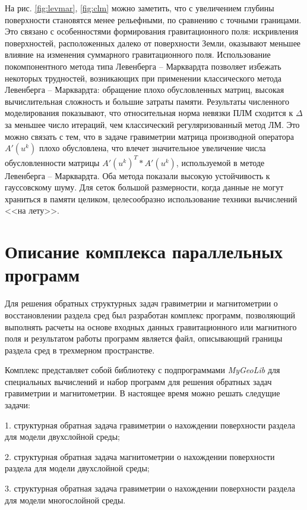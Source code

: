 На рис. \ref{fig:levmar}, \ref{fig:clm} можно заметить, что с увеличением глубины поверхности становятся менее рельефными, по сравнению с точными границами. Это связано с особенностями формирования гравитационного поля: искривления поверхностей, расположенных далеко от поверхности Земли, оказывают меньшее влияние на изменения суммарного гравитационного поля. Использование покомпонентного метода типа Левенберга -- Марквардта позволяет избежать некоторых трудностей, возникающих при применении классического метода Левенберга -- Марквардта: обращение плохо обусловленных матриц, высокая вычислительная сложность и большие затраты памяти. Результаты численного моделирования показывают, что относительная норма невязки ПЛМ сходится к $\Delta$ за меньшее число итераций, чем классический регуляризованный метод ЛМ. Это можно связать с тем, что в задаче гравиметрии матрица производной оператора $A'(u^k)$ плохо обусловлена, что влечет значительное увеличение числа обусловленности матрицы $A'(u^k)^T*A'(u^k)$, используемой в методе Левенберга -- Марквардта. Оба метода показали высокую устойчивость к гауссовскому шуму. Для сеток большой размерности, когда данные не могут храниться в памяти целиком, целесообразно использование техники вычислений <<на лету>>.

\newpage
\section{Описание комплекса параллельных программ}

Для решения обратных структурных задач гравиметрии и магнитометрии о восстановлении раздела сред был разработан комплекс программ, позволяющий выполнять расчеты на основе входных данных гравитационного или магнитного поля и результатом работы программ является файл, описывающий границы раздела сред в трехмерном пространстве.

Комплекс представляет собой библиотеку с подпрограммами \textit{MyGeoLib} для специальных вычислений и набор программ для решения обратных задач гравиметрии и магнитометрии. В настоящее время можно решать следущие задачи:

1. структурная обратная задача гравиметрии о нахождении поверхности раздела для модели двухслойной среды;

2. структурная обратная задача магнитометрии о нахождении поверхности раздела для модели двухслойной среды;

3. структурная обратная задача гравиметрии о нахождении поверхности раздела для модели многослойной среды.

